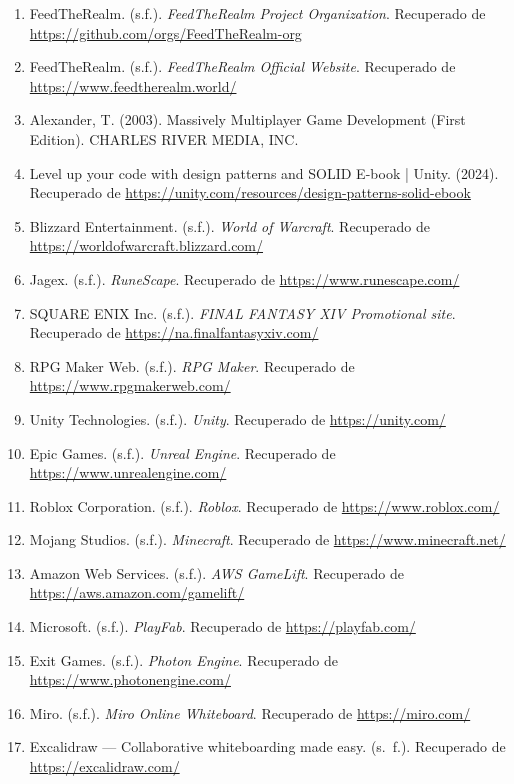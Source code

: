 \begin{enumerate}
  \item FeedTheRealm. (s.f.). \textit{FeedTheRealm Project Organization}. Recuperado de \url{https://github.com/orgs/FeedTheRealm-org}
  \item FeedTheRealm. (s.f.). \textit{FeedTheRealm Official Website}. Recuperado de \url{https://www.feedtherealm.world/}
  \item Alexander, T. (2003). Massively Multiplayer Game Development (First Edition). CHARLES RIVER MEDIA, INC.
  \item Level up your code with design patterns and SOLID E-book | Unity. (2024). Recuperado de \url{https://unity.com/resources/design-patterns-solid-ebook}
  \item Blizzard Entertainment. (s.f.). \textit{World of Warcraft}. Recuperado de \url{https://worldofwarcraft.blizzard.com/}
  \item Jagex. (s.f.). \textit{RuneScape}. Recuperado de \url{https://www.runescape.com/}
  \item SQUARE ENIX Inc. (s.f.). \textit{FINAL FANTASY XIV Promotional site}. Recuperado de \url{https://na.finalfantasyxiv.com/}
  \item RPG Maker Web. (s.f.). \textit{RPG Maker}. Recuperado de \url{https://www.rpgmakerweb.com/}
  \item Unity Technologies. (s.f.). \textit{Unity}. Recuperado de \url{https://unity.com/}
  \item Epic Games. (s.f.). \textit{Unreal Engine}. Recuperado de \url{https://www.unrealengine.com/}
  \item Roblox Corporation. (s.f.). \textit{Roblox}. Recuperado de \url{https://www.roblox.com/}
  \item Mojang Studios. (s.f.). \textit{Minecraft}. Recuperado de \url{https://www.minecraft.net/}
  \item Amazon Web Services. (s.f.). \textit{AWS GameLift}. Recuperado de \url{https://aws.amazon.com/gamelift/}
  \item Microsoft. (s.f.). \textit{PlayFab}. Recuperado de \url{https://playfab.com/}
  \item Exit Games. (s.f.). \textit{Photon Engine}. Recuperado de \url{https://www.photonengine.com/}
  \item Miro. (s.f.). \textit{Miro Online Whiteboard}. Recuperado de \url{https://miro.com/}
  \item Excalidraw — Collaborative whiteboarding made easy. (s. f.). Recuperado de \url{https://excalidraw.com/}

\end{enumerate}
